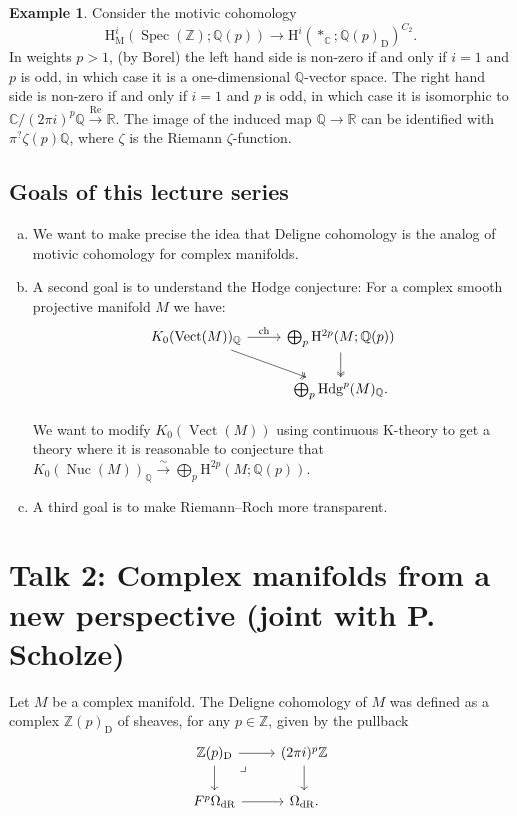 \documentclass[draft]{amsart}
\newcommand{\ZZ}{\mathbb{Z}}
\newcommand{\QQ}{\mathbb{Q}}
\newcommand{\RR}{\mathbb{R}}
\newcommand{\CC}{\mathbb{C}}
\renewcommand{\H}{\mathrm{H}}
\newcommand{\D}{\mathrm{D}}
\newcommand{\isoto}{\mathbin{\xrightarrow{\sim}}}
\DeclareMathOperator{\Spec}{Spec}
\DeclareMathOperator{\Nuc}{Nuc}
\DeclareMathOperator{\Vect}{Vect}
\theoremstyle{definition}
\newtheorem{ex}[thm]{Example}
\begin{document}
\begin{ex}
Consider the motivic cohomology
\[
\H^i_{\mathrm{M}}(\Spec(\ZZ);\QQ(p)) \to \H^i(*_{\CC}; \QQ(p)_{\D})^{C_2}.
\]
In weights $p>1$, (by Borel) the left hand side is non-zero if and only if $i=1$ and $p$ is odd, in which case it is a one-dimensional $\QQ$-vector space. The right hand side is non-zero if and only if $i=1$ and $p$ is odd, in which case it is isomorphic to $\CC/(2\pi i)^p\QQ \xrightarrow{\mathrm{Re}} \RR$. The image of the induced map $\QQ \to \RR$ can be identified with $\pi^? \zeta(p)\QQ$, where $\zeta$ is the Riemann $\zeta$-function.
\end{ex}

\subsection{Goals of this lecture series} 
\begin{enumerate}[(a)]
\item We want to make precise the idea that Deligne cohomology is the analog of motivic cohomology for complex manifolds.

\item A second goal is to understand the Hodge conjecture: For a complex smooth projective manifold $M$ we have:
\[
\begin{tikzcd}
K_0(\Vect(M))_{\QQ} \ar[dr,twoheadrightarrow] \ar[r,"\mathrm{ch}"] & \bigoplus_p \H^{2p}(M; \QQ(p)) \ar[d,twoheadrightarrow] \\
& \bigoplus_p \mathrm{Hdg}^p(M)_{\QQ}.
\end{tikzcd}
\]

We want to modify $K_0(\Vect(M))$ using continuous K-theory to get a theory where it is reasonable to conjecture that $K_0(\Nuc(M))_\QQ \isoto \bigoplus_p \H^{2p}(M;\QQ(p))$.

\item A third goal is to make Riemann--Roch more transparent.
\end{enumerate}

\section{Talk 2: Complex manifolds from a new perspective (joint with P. Scholze)}

Let $M$ be a complex manifold. The Deligne cohomology of $M$ was defined as a complex $\ZZ(p)_{\D}$ of sheaves, for any $p\in\ZZ$, given by the pullback
\[
\begin{tikzcd}
\ZZ(p)_{\D} \ar[d] \ar[dr,phantom, very near start, "\lrcorner"] \ar[r] & (2\pi i)^p\ZZ \ar[d] \\
F^p\Omega_{\mathrm{dR}} \ar[r] & \Omega_{\mathrm{dR}}.
\end{tikzcd}
\]
\end{document}
